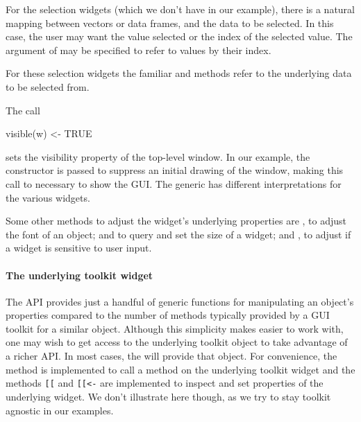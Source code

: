 For the selection widgets (which we don't have in our example), there
is a natural mapping between vectors or data frames, and the data to
be selected. In this case, the user may want the value selected or the
index of the selected value. The  argument of
 may be specified to refer to values by their index. 

For these selection widgets the familiar \meth{[} and \meth{[\ASSIGN}
methods refer to the underlying data to be selected from.



The call
\begin{Schunk}
\begin{Sinput}
 visible(w) <- TRUE
\end{Sinput}
\end{Schunk}
%
sets the visibility property of the top-level window. In our example,
the  constructor is passed  to
suppress an initial drawing of the window, making this call to
 necessary to show the GUI. The
 generic has different interpretations for the
various widgets.

Some other methods to adjust the widget's underlying properties are
, to adjust the font of an object;  and
 to query and set the size of a widget; and
, to adjust if a widget is sensitive to user
input.


\paragraph{The underlying toolkit widget}
The  API provides just a handful of generic functions
for manipulating an object's properties compared to the number of
methods typically provided by a GUI toolkit for a similar
object. Although this simplicity makes  easier to work
with, one may wish to get access to the underlying toolkit object to
take advantage of a richer API. In most cases, the
 will provide that object.  For convenience,
the method  is implemented to call a method on
the underlying toolkit widget and the methods \verb+[[+
and \verb+[[<-+ are implemented to inspect and set
properties of the underlying widget.  We don't illustrate here though,
as we try to stay toolkit agnostic in our examples.


